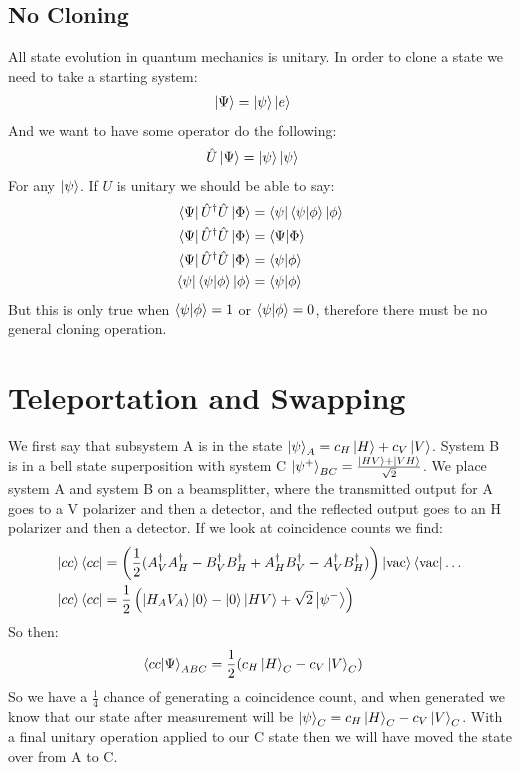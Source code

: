 \subsection{No Cloning}
All state evolution in quantum mechanics is unitary. In order to clone a state we need to take a starting system:
\begin{align*}
	\ket{\Psi} &= \ket{\psi}\ket{e}
\end{align*}
And we want to have some operator do the following:
\begin{align*}
	\hat{U}\ket{\Psi} &= \ket{\psi}\ket{\psi}
\end{align*}
For any $\ket{\psi}$. If $U$ is unitary we should be able to say:
\begin{align*}
	\bra{\Psi} \hat{U}^\dagger \hat{U} \ket{\Phi} &= \bra{\psi}\bra{\psi}\ket{\phi}\ket{\phi} \\
	\bra{\Psi} \hat{U}^\dagger \hat{U} \ket{\Phi} &= \bra{\Psi}\ket{\Phi} \\
	\bra{\Psi} \hat{U}^\dagger \hat{U} \ket{\Phi} &= \bra{\psi}\ket{\phi} \\
	\bra{\psi}\bra{\psi}\ket{\phi}\ket{\phi} &= \bra{\psi}\ket{\phi}
\end{align*}
But this is only true when $\bra{\psi}\ket{\phi} = 1$ or $\bra{\psi}\ket{\phi} = 0$, therefore there must be no general cloning operation.
\section{Teleportation and Swapping}
We first say that subsystem A is in the state $\ket{\psi}_A = c_H \ket{H} + c_V \ket{V}$. System B is in a bell state superposition with system C $\ket{\psi^+}_{BC} = \frac{\ket{HV} + \ket{VH}}{\sqrt{2}}$.
We place system A and system B on a beamsplitter, where the transmitted output for A goes to a V polarizer and then a detector, and the reflected output goes to an H polarizer and then a detector.
If we look at coincidence counts we find:
\begin{align*}
	\ket{cc}\bra{cc} &= \left(\frac{1}{2}( A_V^\dagger A_H^\dagger - B_V^\dagger B_H^\dagger + A_H^\dagger B_V^\dagger - A_V^\dagger B_H^\dagger)\right)\ket{\text{vac}}\bra{\text{vac}}\ldots \\
	\ket{cc}\bra{cc} &= \frac{1}{2}\left(\ket{H_AV_A}\ket{0} -  \ket{0}\ket{HV} + \sqrt{2}\ket{\psi^-}\right)
\end{align*}
So then:
\begin{align*}
	\bra{cc}\ket{\Psi}_{ABC} &= \frac{1}{2} (c_H\ket{H}_C - c_V\ket{V}_C)
\end{align*}
So we have  a $\frac{1}{4}$ chance of generating a coincidence count, and when generated we know that our state after measurement will be $\ket{\psi}_C = c_H\ket{H}_C - c_V\ket{V}_C$.
With a final unitary operation applied to our C state then we will have moved the state over from A to C.

